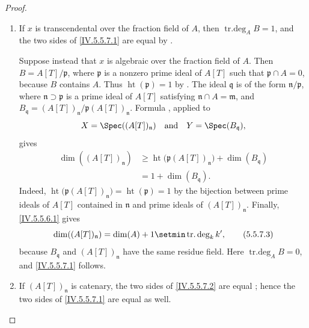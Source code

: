 \begin{proof}
\begin{enumerate}[{\rm(i)}]
\item
If $x$ is transcendental over the fraction field of $A$, then
$\operatorname{tr.deg}_A B=1$, and the two sides of
\eqref{IV.5.5.7.1} are equal by .

Suppose instead that $x$ is algebraic over the fraction field of
$A$.
Then $B=A[T]/\mathfrak p$,
where $\mathfrak p$ is a nonzero prime ideal of $A[T]$ such that
$\mathfrak p\cap A=0$, because $B$ contains $A$.
Thus $\operatorname{ht}(\mathfrak p)=1$
by .
The ideal $\mathfrak q$ is of the form
$\mathfrak n/\mathfrak p$, where
$\mathfrak n\supset\mathfrak p$ is a prime ideal of $A[T]$ satisfying
$\mathfrak n\cap A=\mathfrak m$, and $B_{\mathfrak q}
=(A[T])_{\mathfrak n}/\mathfrak p(A[T])_{\mathfrak n}$.
Formula , applied to
\[
X=\Spec((A[T])_{\mathfrak n})
\quad\text{and}\quad
Y=\Spec(B_{\mathfrak q}),
\]
gives
\begin{equation}
\begin{split}
\dim((A[T])_{\mathfrak n})
 &\geq
 \operatorname{ht}\bigl(\mathfrak p(A[T])_{\mathfrak n}\bigr)
   +\dim(B_{\mathfrak q}) \\
 &=1+\dim(B_{\mathfrak q}).
\end{split}
\tag{5.5.7.2}\label{IV.5.5.7.2}
\end{equation}
Indeed, $\operatorname{ht}\bigl(\mathfrak p(A[T])_{\mathfrak n}\bigr)
=\operatorname{ht}(\mathfrak p)=1$
by the bijection between prime ideals of $A[T]$ contained in
$\mathfrak n$ and prime ideals of $(A[T])_{\mathfrak n}$.
Finally, \eqref{IV.5.5.6.1} gives
\begin{equation}
\dim((A[T])_{\mathfrak n})
 =\dim(A)+1\setmin\operatorname{tr.deg}_k k',
\tag{5.5.7.3}\label{IV.5.5.7.3}
\end{equation}
because $B_{\mathfrak q}$ and $(A[T])_{\mathfrak n}$ have the same
residue field.
Here $\operatorname{tr.deg}_A B=0$, and
\eqref{IV.5.5.7.1} follows.

\item
If $(A[T])_{\mathfrak n}$ is catenary, the two sides of
\eqref{IV.5.5.7.2} are equal ; hence the two sides
of \eqref{IV.5.5.7.1} are equal as well.
\end{enumerate}
\end{proof}

